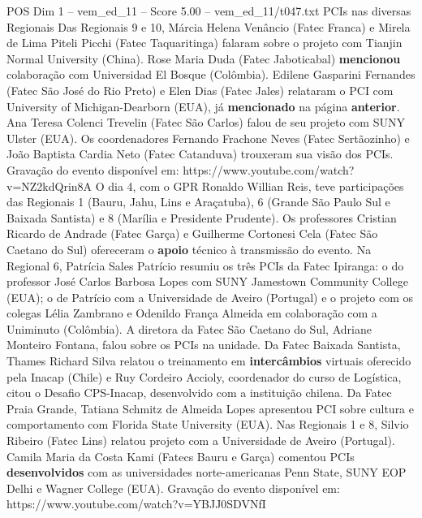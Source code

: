 \begin{textsample}{POS Dim 1 – vem\_ed\_11 – Score 5.00 – vem\_ed\_11/t047.txt}  \label{ex:f1_pos_150}
PCIs nas diversas Regionais Das Regionais 9 e 10, Márcia Helena Venâncio (Fatec Franca) e Mirela de Lima Piteli Picchi (Fatec Taquaritinga) falaram sobre o projeto com Tianjin Normal University (China).
Rose Maria Duda (Fatec Jaboticabal) \textbf{mencionou} colaboração com Universidad El Bosque (Colômbia).
Edilene Gasparini Fernandes (Fatec São José do Rio Preto) e Elen Dias (Fatec Jales) relataram o PCI com University of Michigan-Dearborn (EUA), já \textbf{mencionado} na página \textbf{anterior}.
Ana Teresa Colenci Trevelin (Fatec São Carlos) falou de seu projeto com SUNY Ulster (EUA).
Os coordenadores Fernando Frachone Neves (Fatec Sertãozinho) e João Baptista Cardia Neto (Fatec Catanduva) trouxeram sua visão dos PCIs.
Gravação do evento disponível em: https://www.youtube.com/watch?v=NZ2kdQrin8A O dia 4, com o GPR Ronaldo Willian Reis, teve participações das Regionais 1 (Bauru, Jahu, Lins e Araçatuba), 6 (Grande São Paulo Sul e Baixada Santista) e 8 (Marília e Presidente Prudente).
Os professores Cristian Ricardo de Andrade (Fatec Garça) e Guilherme Cortonesi Cela (Fatec São Caetano do Sul) ofereceram o \textbf{apoio} técnico à transmissão do evento.
Na Regional 6, Patrícia Sales Patrício resumiu os três PCIs da Fatec Ipiranga: o do professor José Carlos Barbosa Lopes com SUNY Jamestown Community College (EUA); o de Patrício com a Universidade de Aveiro (Portugal) e o projeto com os colegas Lélia Zambrano e Odenildo França Almeida em colaboração com a Uniminuto (Colômbia).
A diretora da Fatec São Caetano do Sul, Adriane Monteiro Fontana, falou sobre os PCIs na unidade.
Da Fatec Baixada Santista, Thames Richard Silva relatou o treinamento em \textbf{intercâmbios} virtuais oferecido pela Inacap (Chile) e Ruy Cordeiro Accioly, coordenador do curso de Logística, citou o Desafio CPS-Inacap, desenvolvido com a instituição chilena.
Da Fatec Praia Grande, Tatiana Schmitz de Almeida Lopes apresentou PCI sobre cultura e comportamento com Florida State University (EUA).
Nas Regionais 1 e 8, Silvio Ribeiro (Fatec Lins) relatou projeto com a Universidade de Aveiro (Portugal).
Camila Maria da Costa Kami (Fatecs Bauru e Garça) comentou PCIs \textbf{desenvolvidos} com as universidades norte-americanas Penn State, SUNY EOP Delhi e Wagner College (EUA).
Gravação do evento disponível em: https://www.youtube.com/watch?v=YBJJ0SDVNfI

\end{textsample}
